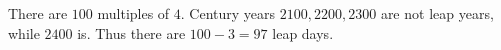 There are $100$ multiples of $4$. Century years $2100,2200,2300$ are not leap years, while $2400$ is. Thus there are $100-3=\boxed{97}$ leap days.
